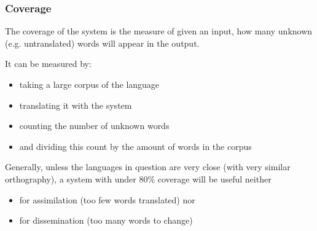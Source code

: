 \documentclass[10pt,xetex]{beamer} %
\begin{document}
\begin{frame}
  \frametitle{Coverage}%

The coverage of the system is the measure of given an input, how many 
unknown (e.g. untranslated) words will appear in the output.

It can be measured by:

\begin{itemize}

  \item taking a large corpus of the language
  \item translating it with the system
  \item counting the number of unknown words
  \item and dividing this count by the amount of words in the corpus
\end{itemize}

Generally, unless the languages in question are very close (with very similar
orthography), a system with under 80\% coverage will be useful neither

\begin{itemize} 
  \item for assimilation (too few words translated) nor 
  \item for dissemination (too many words to change)
\end{itemize}

\end{frame}
%
%
%
%
%
%
%
%
\end{document}
